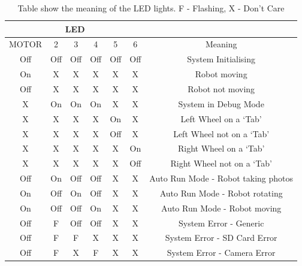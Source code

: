 \begin{table}
\centering
\caption{Table show the meaning of the LED lights. F - Flashing, X - Don't Care}
\label{table:LEDs}
\begin{tabular}{|c|c|c|c|c|c|c|}\cline{1-6}
\multicolumn{6}{|c|}{LED} \\ \hline
MOTOR 	& 2		& 3 	& 4 	& 5 	& 6 	& Meaning\\ \hline
Off		& Off	& Off	& Off	& Off	& Off	& System Initialising \\
On		& X		& X		& X		& X		& X		& Robot moving\\
Off		& X		& X		& X		& X		& X		& Robot not moving\\
X		& On	& On	& On	& X		& X 	& System in Debug Mode \\
X		& X		& X		& X		& On	& X		& Left Wheel on a `Tab'	\\
X		& X		& X		& X		& Off	& X		& Left Wheel not on a `Tab'	\\
X		& X		& X		& X		& X 	& On	& Right Wheel on a `Tab'	\\
X		& X		& X		& X		& X		& Off	& Right Wheel not on a `Tab'	\\
Off		& On	& Off	& Off	& X		& X		& Auto Run Mode - Robot taking photos	\\
On		& Off	& On	& Off	& X		& X		& Auto Run Mode - Robot rotating	\\
On		& Off	& Off	& On	& X		& X		& Auto Run Mode - Robot moving\\
Off		& F		& Off	& Off	& X		& X		& System Error - Generic\\
Off		& F		& F		& X		& X		& X		& System Error - SD Card Error\\
Off		& F		& X		& F		& X		& X		& System Error - Camera Error\\ \hline
\end{tabular}
\end{table}
